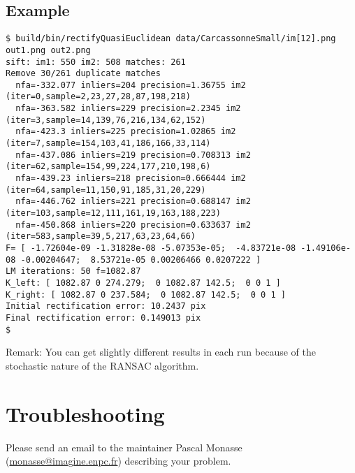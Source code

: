 \documentclass[a4paper]{article}
\begin{document}
\subsection{Example}
\begin{verbatim}
$ build/bin/rectifyQuasiEuclidean data/CarcassonneSmall/im[12].png out1.png out2.png
sift: im1: 550 im2: 508 matches: 261
Remove 30/261 duplicate matches
  nfa=-332.077 inliers=204 precision=1.36755 im2 (iter=0,sample=2,23,27,28,87,198,218)
  nfa=-363.582 inliers=229 precision=2.2345 im2 (iter=3,sample=14,139,76,216,134,62,152)
  nfa=-423.3 inliers=225 precision=1.02865 im2 (iter=7,sample=154,103,41,186,166,33,114)
  nfa=-437.086 inliers=219 precision=0.708313 im2 (iter=62,sample=154,99,224,177,210,198,6)
  nfa=-439.23 inliers=218 precision=0.666444 im2 (iter=64,sample=11,150,91,185,31,20,229)
  nfa=-446.762 inliers=221 precision=0.688147 im2 (iter=103,sample=12,111,161,19,163,188,223)
  nfa=-450.868 inliers=220 precision=0.633637 im2 (iter=583,sample=39,5,217,63,23,64,66)
F= [ -1.72604e-09 -1.31828e-08 -5.07353e-05;  -4.83721e-08 -1.49106e-08 -0.00204647;  8.53721e-05 0.00206466 0.0207222 ]
LM iterations: 50 f=1082.87
K_left: [ 1082.87 0 274.279;  0 1082.87 142.5;  0 0 1 ]
K_right: [ 1082.87 0 237.584;  0 1082.87 142.5;  0 0 1 ]
Initial rectification error: 10.2437 pix
Final rectification error: 0.149013 pix
$
\end{verbatim}
Remark: You can get slightly different results in each run because of the stochastic nature of the RANSAC algorithm.

\section{Troubleshooting}
Please send an email to the maintainer Pascal Monasse (\href{mailto:monasse@imagine.enpc.fr}{monasse@imagine.enpc.fr}) describing your problem.
\end{document}
